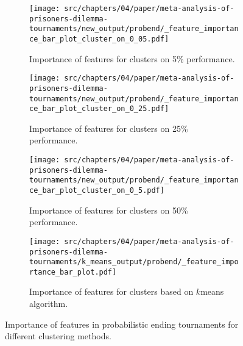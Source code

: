 \begin{figure}[!htbp]
    \begin{subfigure}[t]{0.5\textwidth}
        \begin{center}
            \texttt{[image: src/chapters/04/paper/meta-analysis-of-prisoners-dilemma-tournaments/new\_output/probend/\_feature\_importance\_bar\_plot\_cluster\_on\_0\_05.pdf]}
        \end{center}
        \caption{Importance of features for clusters on 5\% performance.}
    \end{subfigure}
    \begin{subfigure}[t]{0.5\textwidth}
        \begin{center}
            \texttt{[image: src/chapters/04/paper/meta-analysis-of-prisoners-dilemma-tournaments/new\_output/probend/\_feature\_importance\_bar\_plot\_cluster\_on\_0\_25.pdf]}
        \end{center}
        \caption{Importance of features for clusters on 25\% performance.}
    \end{subfigure}
    \begin{subfigure}[t]{0.5\textwidth}
        \begin{center}
            \texttt{[image: src/chapters/04/paper/meta-analysis-of-prisoners-dilemma-tournaments/new\_output/probend/\_feature\_importance\_bar\_plot\_cluster\_on\_0\_5.pdf]}
        \end{center}
        \caption{Importance of features for clusters on 50\% performance.}
    \end{subfigure}
    \begin{subfigure}[t]{0.5\textwidth}
        \begin{center}
            \texttt{[image: src/chapters/04/paper/meta-analysis-of-prisoners-dilemma-tournaments/k\_means\_output/probend/\_feature\_importance\_bar\_plot.pdf]}
        \end{center}
        \caption{Importance of features for clusters based on \(k\)means algorithm.}
    \end{subfigure}
    \caption{Importance of features in probabilistic ending tournaments for different
    clustering methods.}\label{fig:clustering_importance_probend}
\end{figure}

